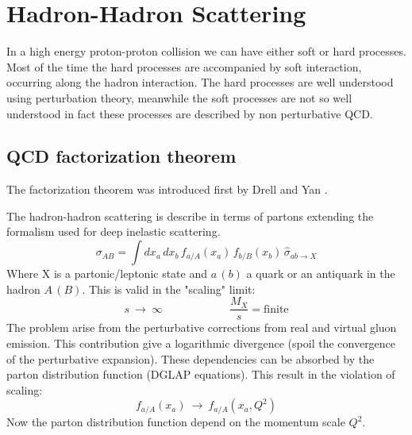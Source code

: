 %
%
%

%


\chapter{Hadron-Hadron Scattering}
\label{chap:Hadron-HadronScattering}

In a high energy proton-proton collision we can have either soft or hard processes. Most of the time the hard processes are accompanied by soft interaction, occurring along the hadron interaction.
The hard processes are well understood using perturbation theory, meanwhile the soft processes are not so well understood in fact these processes are described by non perturbative QCD. 

\section{QCD factorization theorem}

The factorization theorem was introduced first by Drell and Yan \cite{DRELL1971578}.

The hadron-hadron scattering is describe in terms of partons extending the formalism used for deep inelastic scattering. 
\begin{equation}
\sigma_{AB}=\displaystyle\int dx_a\,dx_b\,f_{a/A}(x_a)\,f_{b/B}(x_b)\,\hat{\sigma}_{ab \rightarrow X}
\label{eq:factorization1}
\end{equation}
Where X is a partonic/leptonic state and $a\,(b)$ a quark or an antiquark in the hadron $A\,(B)$. This is valid in the "scaling" limit:
\begin{equation}
	s\ \longrightarrow\ \infty \qquad\qquad\qquad \frac{M_X}{s}=\text{finite}
\end{equation}
The problem arise from the perturbative corrections from real and virtual gluon emission. This contribution give a logarithmic divergence (spoil the convergence of the perturbative expansion). These dependencies can be absorbed by the parton distribution function (DGLAP equations). This result in the violation of scaling:
\begin{equation}
	f_{a/A}(x_a)\ \longrightarrow\ f_{a/A}(x_a, Q^2)
\end{equation}  
Now the parton distribution function depend on the momentum scale $Q^2$. 

